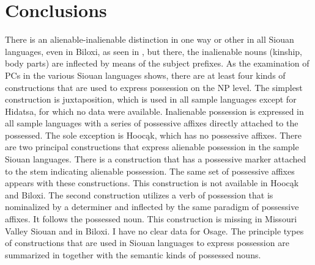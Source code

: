 \documentclass[output=paper]{LSP/langsci}
\begin{document}
\section{Conclusions}
There is an alienable-inalienable distinction in one way or other in all Siouan languages, even in Biloxi, as seen in , but there, the inalienable nouns (kinship, body parts) are inflected by means of the subject prefixes. As the examination of PCs in the various Siouan languages shows, there are at least four kinds of constructions that are used to express possession on the NP level. The simplest construction is  juxtaposition, which is used in all sample languages except for Hidatsa, for which no data were available. Inalienable possession is expressed in all sample languages with a series of possessive affixes directly attached to the possessed. The sole exception is Hoocąk, which has no possessive affixes. There are two principal constructions that express alienable possession in the sample Siouan languages. There is a construction that has a possessive marker attached to the stem indicating alienable possession. The same set of possessive affixes appears with these constructions. This construction is not available in Hoocąk and Biloxi. The second construction utilizes a verb of possession that is nominalized by a determiner and inflected by the same paradigm of possessive affixes. It follows the possessed noun. This construction is missing in Missouri Valley Siouan and in Biloxi. I have no clear data for Osage. The principle types of constructions that are used in Siouan languages to express possession are summarized in  together with the semantic kinds of possessed nouns. 
\end{document}
